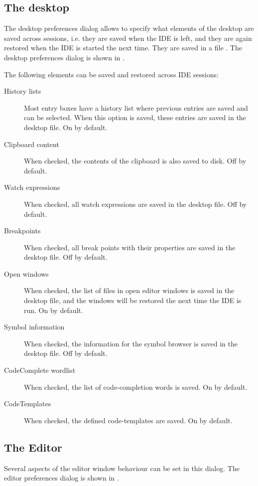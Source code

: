 \subsection{The desktop}
\label{se:prefdesktop}
The desktop preferences dialog allows to specify what elements of the
desktop are saved across sessions, i.e. they are saved when the IDE is left,
and they are again restored when the IDE is started the next time. 
They are saved in a file .
The desktop preferences dialog is shown in .


The following elements can be saved and restored across IDE sessions:
\begin{description}
\item[History lists] Most entry boxes have a history list where previous
entries are saved and can be selected. When this option is saved, these
entries are saved in the desktop file. On by default.
\item[Clipboard content]
When checked, the contents of the clipboard is also saved to disk. Off by
default.
\item[Watch expressions]
When checked, all watch expressions are saved in the desktop file. Off by
default.
\item[Breakpoints] 
When checked, all break points with their properties are saved in the
desktop file. Off by default.
\item[Open windows]
When checked, the list of files in open editor windows is saved in the 
desktop file, and the windows will be restored the next time the IDE 
is run. On by default.
\item[Symbol information]
When checked, the information for the symbol browser is saved in the desktop
file. Off by default.
\item[CodeComplete wordlist]
When checked, the list of code-completion words is saved. On by default.
\item[CodeTemplates]
When checked, the defined code-templates are saved. On by default.
\end{description}

%
%
\subsection{The Editor}
Several aspects of the editor window behaviour can be set in this dialog.
The editor preferences dialog is shown in .

